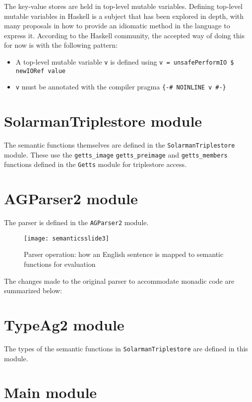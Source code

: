 \documentclass[../main.tex]{subfiles}
\begin{document}
	The key-value stores are held in top-level mutable variables.  Defining top-level mutable variables in Haskell is a subject that has been explored in depth, with many proposals in how to provide an idiomatic method in the language to express it.  According to the Haskell community, the accepted way of doing this for now is with the following pattern:
	
	\begin{itemize}
		\item A top-level mutable variable \texttt{v} is defined using \texttt{v = unsafePerformIO \$ newIORef value} 
		\item \texttt{v} must be annotated with the compiler pragma \texttt{\{\--\# NOINLINE v \#\--\}}
	\end{itemize}
	
	
\section{SolarmanTriplestore module}

The semantic functions themselves are defined in the \texttt{SolarmanTriplestore} module.  These use the \texttt{getts\_image} \texttt{getts\_preimage} and \texttt{getts\_members} functions defined in the \texttt{Getts} module for triplestore access.

\section{AGParser2 module}

The parser is defined in the \texttt{AGParser2} module.

\begin{figure}[h]
	\centering
	\texttt{[image: semanticsslide3]}
	\caption{Parser operation: how an English sentence is mapped to semantic functions for evaluation \cite{graphmqslide}}
\end{figure}

The changes made to the original parser to accommodate monadic code are summarized below:

\section{TypeAg2 module}

The types of the semantic functions in \texttt{SolarmanTriplestore} are defined in this module.  

\section{Main module}
\end{document}
